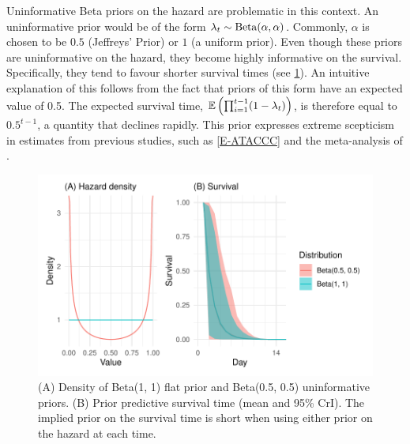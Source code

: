 \documentclass[thesis.tex]{subfiles}
\begin{document}
Uninformative Beta priors on the hazard are problematic in this context.
An uninformative prior would be of the form $\lambda_t \sim \operatorname{Beta}(\alpha, \alpha)$.
Commonly, $\alpha$ is chosen to be $0.5$ (Jeffreys' Prior) or $1$ (a uniform prior).
Even though these priors are uninformative on the hazard, they become highly informative on the survival. 
Specifically, they tend to favour shorter survival times (see \cref{perf-test:fig:flat-prior}).
An intuitive explanation of this follows from the fact that priors of this form have an expected value of 0.5.
The expected survival time, $\operatorname{\mathbb{E}} \left( \prod_{i=1}^{t-1} (1-\lambda_t) \right)$, is therefore equal to $0.5^{t-1}$, a quantity that declines rapidly.
This prior expresses extreme scepticism in estimates from previous studies, such as \cref{E-ATACCC} and the meta-analysis of \textcite{cevikShedding}.
\begin{figure}
  \centering \includegraphics{cis-perfect-testing/flat-prior}
  \caption[Uninformative priors for the hazard]{
    (A) Density of Beta(1, 1) flat prior and Beta(0.5, 0.5) uninformative priors.
    (B) Prior predictive survival time (mean and 95\% CrI).
    The implied prior on the survival time is short when using either prior on the hazard at each time.
  }
 \label{perf-test:fig:flat-prior}
\end{figure}
\end{document}
